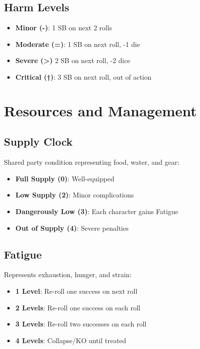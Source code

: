 \documentclass[11pt,twoside]{article}
\begin{document}
\subsection{Harm Levels}
\begin{itemize}[leftmargin=*]
    \item \textbf{Minor (-)}: 1 SB on next 2 rolls
    \item \textbf{Moderate (=)}: 1 SB on next roll, -1 die
    \item \textbf{Severe (>) } 2 SB on next roll, -2 dice
    \item \textbf{Critical (†)}: 3 SB on next roll, out of action
\end{itemize}

\section{Resources and Management}

\subsection{Supply Clock}
Shared party condition representing food, water, and gear:
\begin{itemize}[leftmargin=*]
    \item \textbf{Full Supply (0)}: Well-equipped
    \item \textbf{Low Supply (2)}: Minor complications
    \item \textbf{Dangerously Low (3)}: Each character gains Fatigue
    \item \textbf{Out of Supply (4)}: Severe penalties
\end{itemize}

\subsection{Fatigue}
Represents exhaustion, hunger, and strain:
\begin{itemize}[leftmargin=*]
    \item \textbf{1 Level}: Re-roll one success on next roll
    \item \textbf{2 Levels}: Re-roll one success on each roll
    \item \textbf{3 Levels}: Re-roll two successes on each roll
    \item \textbf{4 Levels}: Collapse/KO until treated
\end{itemize}
\end{document}

